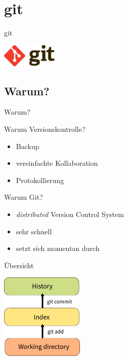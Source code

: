 \section{git}
\begin{frame}{git}
  \begin{center}
    \includegraphics[width=100px]{../Notes/img/git.pdf}
  \end{center}
  \tableofcontents[sectionstyle=show/hide,
                   subsectionstyle=show/show/hide,
                   subsubsectionstyle=show/show/show]
\end{frame}

\subsection{Warum?}
\begin{frame}{Warum?}
  \begin{block}{Warum Versionskontrolle?}
    \begin{itemize}
      \item Backup
      \item vereinfachte Kollaboration
      \item Protokollierung
    \end{itemize}
  \end{block}
  \begin{block}{Warum Git?}
    \begin{itemize}
      \item \textit{distributed} Version Control System
      \item sehr schnell
      \item setzt sich momentan durch
    \end{itemize}
  \end{block}
\end{frame}

\begin{frame}{Übersicht}
  \begin{center}
    \includegraphics[width=150px]{img/git_repo.pdf}
  \end{center}
\end{frame}

